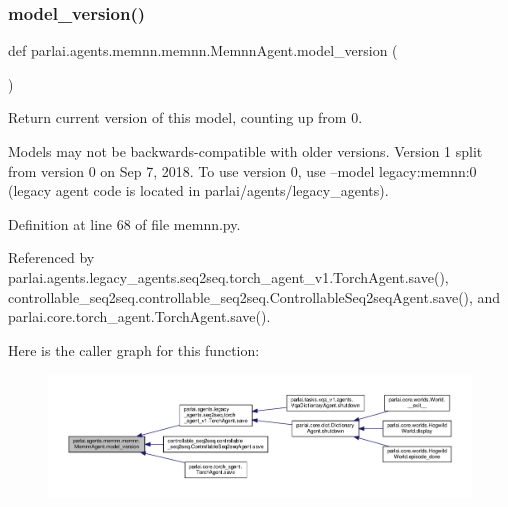 \subsubsection{\texorpdfstring{model\+\_\+version()}{model\_version()}}
{\footnotesize\ttfamily def parlai.\+agents.\+memnn.\+memnn.\+Memnn\+Agent.\+model\+\_\+version (\begin{DoxyParamCaption}{ }\end{DoxyParamCaption})\hspace{0.3cm}{\ttfamily [static]}}

\begin{DoxyVerb}Return current version of this model, counting up from 0.

Models may not be backwards-compatible with older versions.
Version 1 split from version 0 on Sep 7, 2018.
To use version 0, use --model legacy:memnn:0
(legacy agent code is located in parlai/agents/legacy_agents).
\end{DoxyVerb}
 

Definition at line 68 of file memnn.\+py.



Referenced by parlai.\+agents.\+legacy\+\_\+agents.\+seq2seq.\+torch\+\_\+agent\+\_\+v1.\+Torch\+Agent.\+save(), controllable\+\_\+seq2seq.\+controllable\+\_\+seq2seq.\+Controllable\+Seq2seq\+Agent.\+save(), and parlai.\+core.\+torch\+\_\+agent.\+Torch\+Agent.\+save().

Here is the caller graph for this function\+:
\nopagebreak
\begin{figure}[H]
\begin{center}
\leavevmode
\includegraphics[width=350pt]{classparlai_1_1agents_1_1memnn_1_1memnn_1_1MemnnAgent_ae6e06364ccf919d70064d5966e5c1cf3_icgraph}
\end{center}
\end{figure}
\mbox{\label{classparlai_1_1agents_1_1memnn_1_1memnn_1_1MemnnAgent_a10b5418eda4da7bc85913e24e5b5a029}} 
